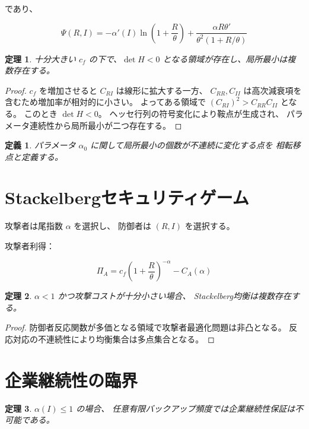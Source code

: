 \documentclass[12pt,a4paper]{article}
\newtheorem{theorem}{定理}
\newtheorem{definition}{定義}
\begin{document}
であり、

\begin{equation}
\Psi(R,I)=
-\alpha'(I)\ln\left(1+\frac{R}{\theta}\right)
+\frac{\alpha R\theta'}{\theta^2(1+R/\theta)}
\end{equation}

\begin{theorem}
十分大きい $c_f$ の下で、$\det H<0$ となる領域が存在し、局所最小は複数存在する。
\end{theorem}

\begin{proof}
$c_f$ を増加させると $C_{RI}$ は線形に拡大する一方、
$C_{RR},C_{II}$ は高次減衰項を含むため増加率が相対的に小さい。
よってある領域で $(C_{RI})^2>C_{RR}C_{II}$ となる。
このとき $\det H<0$。
ヘッセ行列の符号変化により鞍点が生成され、
パラメータ連続性から局所最小が二つ存在する。
\end{proof}

\begin{definition}
パラメータ $\alpha_0$ に関して局所最小の個数が不連続に変化する点を
相転移点と定義する。
\end{definition}

\section{Stackelbergセキュリティゲーム}

攻撃者は尾指数 $\alpha$ を選択し、
防御者は $(R,I)$ を選択する。

攻撃者利得：

\begin{equation}
\Pi_A=c_f\left(1+\frac{R}{\theta}\right)^{-\alpha}-C_A(\alpha)
\end{equation}

\begin{theorem}
$\alpha<1$ かつ攻撃コストが十分小さい場合、
Stackelberg均衡は複数存在する。
\end{theorem}

\begin{proof}
防御者反応関数が多価となる領域で攻撃者最適化問題は非凸となる。
反応対応の不連続性により均衡集合は多点集合となる。
\end{proof}

\section{企業継続性の臨界}

\begin{theorem}
$\alpha(I)\le 1$ の場合、
任意有限バックアップ頻度では企業継続性保証は不可能である。
\end{theorem}
\end{document}
